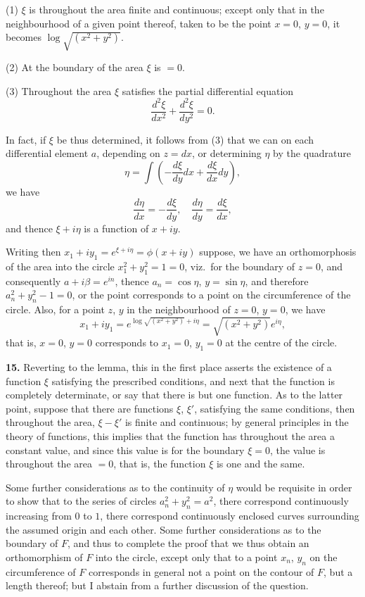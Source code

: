 \documentclass[11pt,a4paper]{book}
\begin{document}
(1) $\xi$ is throughout the area finite and continuous; except only that in the neighbourhood of a given point thereof, taken to be the point $x = 0$, $y = 0$, it becomes $\log \sqrt{(x^2 + y^2)}$.

(2) At the boundary of the area $\xi$ is $= 0$.

(3) Throughout the area $\xi$ satisfies the partial differential equation
\[
\frac{d^2 \xi}{d x^2} + \frac{d^2 \xi}{d y^2} = 0.
\]

In fact, if $\xi$ be thus determined, it follows from (3) that we can on each differential element $a$, depending on $z = dx$, or determining $\eta$ by the quadrature
\[
\eta = \int \left(-\frac{d \xi}{dy} dx + \frac{d \xi}{dx} dy\right),
\]
we have
\[
\frac{d\eta}{d x} = -\frac{d \xi}{d y}, \quad \frac{d \eta}{d y} = \frac{d \xi}{d x},
\]
and thence $\xi + i\eta$ is a function of $x + iy$.

Writing then $x_1 + i y_1 = e^{\xi + i \eta} = \phi(x + iy)$ suppose, we have an orthomorphosis of the area into the circle $x_1^2 + y_1^2 = 1 = 0$, viz.\ for the boundary of $z = 0$, and consequently $a + i\beta = e^{i n}$, thence $a_n = \cos \eta$, $y = \sin \eta$, and therefore $a_n^2 + y_n^2 - 1 = 0$, or the point corresponds to a point on the circumference of the circle. Also, for a point $z$, $y$ in the neighbourhood of $z = 0$, $y = 0$, we have
\[
x_1 + i y_1 = e^{\log \sqrt{(x^2 + y^2)} + i \eta} = \sqrt{(x^2 + y^2)} e^{i\eta},
\]
that is, $x = 0$, $y = 0$ corresponds to $x_1 = 0$, $y_1 = 0$ at the centre of the circle.

\textbf{15.} Reverting to the lemma, this in the first place asserts the existence of a function $\xi$ satisfying the prescribed conditions, and next that the function is completely determinate, or say that there is but one function. As to the latter point, suppose that there are functions $\xi$, $\xi'$, satisfying the same conditions, then throughout the area, $\xi - \xi'$ is finite and continuous; by general principles in the theory of functions, this implies that the function has throughout the area a constant value, and since this value is for the boundary $\xi = 0$, the value is throughout the area $= 0$, that is, the function $\xi$ is one and the same.

Some further considerations as to the continuity of $\eta$ would be requisite in order to show that to the series of circles $a_n^2 + y_n^2 = a^2$, there correspond continuously increasing from $0$ to $1$, there correspond continuously enclosed curves surrounding the assumed origin and each other. Some further considerations as to the boundary of $F$, and thus to complete the proof that we thus obtain an orthomorphism of $F$ into the circle, except only that to a point $x_n$, $y_n$ on the circumference of $F$ corresponds in general not a point on the contour of $F$, but a length thereof; but I abstain from a further discussion of the question.
\end{document}
